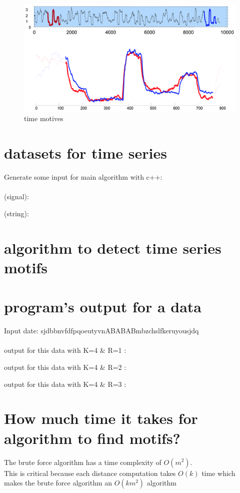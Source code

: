 \documentclass[12pt,a4paper]{article}
\begin{document}
	\begin{figure}[h]
	\includegraphics[width=\textwidth]{pic2.png}
	\caption{time motives}
	\end{figure}
	\section{datasets for time series}
	Generate some input for main algorithm with c++:
	\\ \\ (signal):
	
	\pagebreak
	(string):
	
	\section{algorithm to detect time series motifs}
	
	\pagebreak
	\section{program’s output for a data}
	Input date: sjdbbnvfdfpqoeutyvnABABABmbzchslfkeruyousjdq
	\\ \\ output for this data with K=4 \& R=1 :
	
	output for this data with K=4 \& R=2 :
	
	output for this data with K=4 \& R=3 :
	
	\pagebreak
	\section{How much time it takes for algorithm to find motifs?}
	The brute force algorithm has a time complexity of $O(m^2)$.
	\\ This is critical because each distance computation takes $O(k)$ time
which makes the brute force algorithm an $O(k m^2)$ algorithm
	\begin{figure}[h]
		
	\end{figure}
\end{document}
